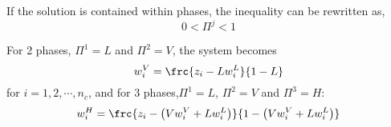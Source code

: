 \documentclass[12pt,a4paper,oneside]{report}%
\begin{document}
If the solution is contained within  phases, the inequality can be rewritten as,
\begin{equation}
0 < \Pi^{j} < 1
\end{equation}



For 2 phases, $\Pi^{1}=L$ and $\Pi^{2}=V$, the system becomes %
\begin{displaymath}
w_{i}^{V} = \frc{z_{i}-Lw_{i}^{L}}{1-L}
\end{displaymath}
for $i=1,2,\cdots,n_{c}$, and for 3 phases,$\Pi^{1}=L$, $\Pi^{2}=V$ and $\Pi^{3}=H$:
\begin{displaymath}
w_{i}^{H} = \frc{z_{i}-\left(V w_{i}^{V} + L w_{i}^{L}\right)}{1 - \left(V w_{i}^{V} + L w_{i}^{L}\right)}
\end{displaymath}

\end{document}
